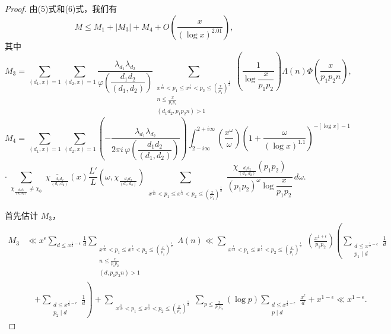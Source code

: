 \begin{proof}
由(5)式和(6)式，我们有
\begin{equation}\label{eq:chen7}
M\leqslant M_1+|M_3|+M_4+O\left(\frac{x}{(\log x)^{2.01}}\right),
\end{equation}
其中
\[
M_3=\sum_{(d_1,x)=1}\sum_{(d_2,x)=1}\frac{\lambda_{d_1}\lambda_{d_2}}{\varphi\left(\dfrac{d_1d_2}{(d_1,d_2)}\right)}
\sum_{\substack{x^{\frac1{10}}<p_1\leqslant x^{\frac13}<p_2\leqslant(\frac{x}{p_1})^{\frac12}\\n\leqslant\frac{x}{p_1p_2}\\(d_1d_2,p_1p_2n)>1}}
\left(\frac{1}{\log\dfrac{x}{p_1p_2}}\right)\Lambda(n)\Phi\left(\frac{x}{p_1p_2n}\right),
\]
\[
M_4=\sum_{(d_1,x)=1}\sum_{(d_2,x)=1}\left(-\frac{\lambda_{d_1}\lambda_{d_2}}{2\pi i\,\varphi\left(\dfrac{d_1d_2}{(d_1,d_2)}\right)}\right)
\int_{2-i\infty}^{2+i\infty}\left(\frac{x^\omega}{\omega}\right)\left(1+\frac{\omega}{(\log x)^{1.1}}\right)^{-[\log x]-1}
\]
\[
\cdot\sum_{\substack{\chi_{\frac{d_1d_2}{(d_1,d_2)}}\neq\chi_0}}\overline{\chi_{\frac{d_1d_2}{(d_1,d_2)}}}(x)\frac{L'}{L}\left(\omega,\chi_{\frac{d_1d_2}{(d_1,d_2)}}\right)
\sum_{\substack{x^{\frac1{10}}<p_1\leqslant x^{\frac13}<p_2\leqslant(\frac{x}{p_1})^{\frac12}}}
\frac{\chi_{\frac{d_1d_2}{(d_1,d_2)}}(p_1p_2)}{(p_1p_2)^\omega\log\dfrac{x}{p_1p_2}}\,d\omega.
\]

首先估计 $M_3$，
\begin{align*}
M_3&\ll x^\epsilon\sum_{d\leqslant x^{\frac12-\epsilon}}\frac1d
\sum_{\substack{x^{\frac1{10}}<p_1\leqslant x^{\frac13}<p_2\leqslant(\frac{x}{p_1})^{\frac12}\\n\leqslant\frac{x}{p_1p_2}\\(d,p_1p_2n)>1}}\Lambda(n)
\ll\sum_{\substack{x^{\frac1{10}}<p_1\leqslant x^{\frac13}<p_2\leqslant(\frac{x}{p_1})^{\frac12}}}
\left(\frac{x^{1+\epsilon}}{p_1p_2}\right)\left(\sum_{\substack{d\leqslant x^{\frac12-\epsilon}\\p_1\mid d}}\frac1d\right.\\
&\quad\left.+\sum_{\substack{d\leqslant x^{\frac12-\epsilon}\\p_2\mid d}}\frac1d\right)
+\sum_{\substack{x^{\frac1{10}}<p_1\leqslant x^{\frac13}<p_2\leqslant(\frac{x}{p_1})^{\frac12}}}\sum_{p\leqslant\frac{x}{p_1p_2}}(\log p)
\sum_{\substack{d\leqslant x^{\frac12-\epsilon}\\p\mid d}}\frac{x^\epsilon}{d}+x^{1-\epsilon}\ll x^{1-\epsilon}.\tag{8}
\end{align*}


\end{proof}
